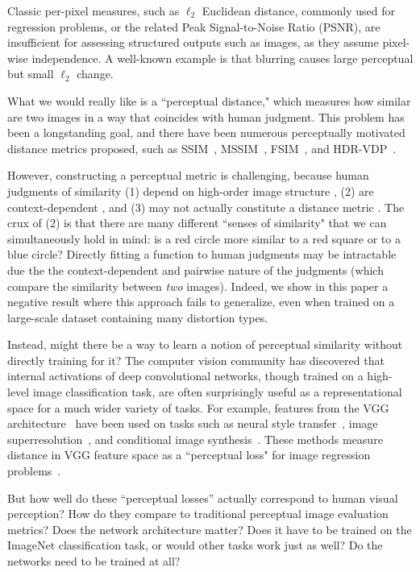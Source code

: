 Classic per-pixel measures, such as $\ell_2$ Euclidean distance, commonly used for regression problems, or the related Peak Signal-to-Noise Ratio (PSNR), are insufficient for assessing structured outputs such as images, as they assume pixel-wise independence. A well-known example is that blurring causes large perceptual but small $\ell_2$ change.

What we would really like is a ``perceptual distance," which measures how similar are two images in a way that coincides with human judgment. This problem has been a longstanding goal, and there have been numerous perceptually motivated distance metrics proposed, such as SSIM~\cite{wang2004image}, MSSIM~\cite{wang2003multiscale}, FSIM~\cite{zhang2011fsim}, and HDR-VDP~\cite{mantiuk2011hdr}.

However, constructing a perceptual metric is challenging, because human judgments of similarity (1) depend on high-order image structure \cite{wang2004image}, (2) are context-dependent \cite{Goodman1972,medin1993respects,markman2005nonintentional}, and (3) may not actually constitute a distance metric \cite{tversky1977features}. The crux of (2) is that there are many different ``senses of similarity" that we can simultaneously hold in mind: is a red circle more similar to a red square or to a blue circle? Directly fitting a function to human judgments may be intractable due the the context-dependent and pairwise nature of the judgments (which compare the similarity between \textit{two} images). Indeed, we show in this paper a negative result where this approach fails to generalize, even when trained on a large-scale dataset containing many distortion types.

Instead, might there be a way to learn a notion of perceptual similarity without directly training for it? The computer vision community has discovered that internal activations of deep convolutional networks, though trained on a high-level image classification task, are often surprisingly useful as a representational space for a much wider variety of tasks. For example, features from the VGG architecture~\cite{simonyan2014very} have been used on tasks such as neural style transfer~\cite{gatys2016image}, image superresolution~\cite{johnson2016perceptual}, and conditional image synthesis~\cite{dosovitskiy2016generating,chen2017photographic}. These methods measure distance in VGG feature space as a ``perceptual loss" for image regression problems~\cite{johnson2016perceptual,dosovitskiy2016generating}.

But how well do these ``perceptual losses'' actually correspond to human visual perception? How do they compare to traditional perceptual image evaluation metrics? Does the network architecture matter? Does it have to be trained on the ImageNet classification task, or would other tasks work just as well?  Do the networks need to be trained at all?


